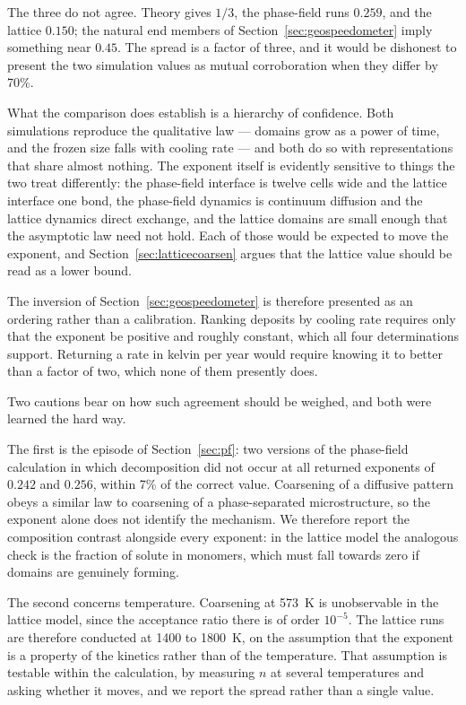 \documentclass[preprint,12pt,authoryear]{elsarticle}
\begin{document}
The three do not agree. Theory gives $1/3$, the phase-field runs $0.259$, and
the lattice $0.150$; the natural end members of Section~\ref{sec:geospeedometer}
imply something near $0.45$. The spread is a factor of three, and it would be
dishonest to present the two simulation values as mutual corroboration when they
differ by 70\%.

What the comparison does establish is a hierarchy of confidence. Both
simulations reproduce the qualitative law --- domains grow as a power of time,
and the frozen size falls with cooling rate --- and both do so with
representations that share almost nothing. The exponent itself is evidently
sensitive to things the two treat differently: the phase-field interface is
twelve cells wide and the lattice interface one bond, the phase-field dynamics
is continuum diffusion and the lattice dynamics direct exchange, and the lattice
domains are small enough that the asymptotic law need not hold. Each of those
would be expected to move the exponent, and Section~\ref{sec:latticecoarsen}
argues that the lattice value should be read as a lower bound.

The inversion of Section~\ref{sec:geospeedometer} is therefore presented as an
ordering rather than a calibration. Ranking deposits by cooling rate requires
only that the exponent be positive and roughly constant, which all four
determinations support. Returning a rate in kelvin per year would require
knowing it to better than a factor of two, which none of them presently does.

Two cautions bear on how such agreement should be weighed, and both were learned
the hard way.

The first is the episode of Section~\ref{sec:pf}: two versions of the
phase-field calculation in which decomposition did not occur at all returned
exponents of $0.242$ and $0.256$, within 7\% of the correct value. Coarsening of
a diffusive pattern obeys a similar law to coarsening of a phase-separated
microstructure, so the exponent alone does not identify the mechanism. We
therefore report the composition contrast alongside every exponent: in the
lattice model the analogous check is the fraction of solute in monomers, which
must fall towards zero if domains are genuinely forming.

The second concerns temperature. Coarsening at 573~K is unobservable in the
lattice model, since the acceptance ratio there is of order $10^{-5}$. The
lattice runs are therefore conducted at 1400 to 1800~K, on the assumption that
the exponent is a property of the kinetics rather than of the temperature. That
assumption is testable within the calculation, by measuring $n$ at several
temperatures and asking whether it moves, and we report the spread rather than a
single value.
\end{document}
